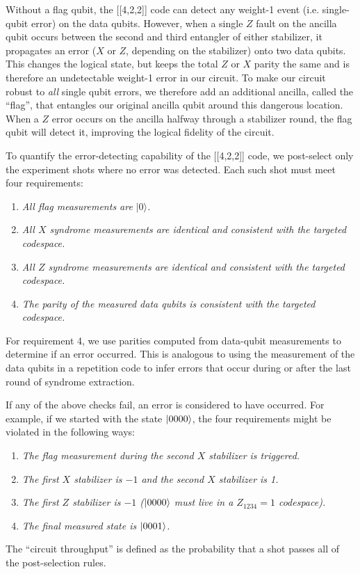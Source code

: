 \documentclass[aps,prl,twocolumn,superscriptaddress,nobibnotes,10pt,floatfix]{revtex4-2}
\begin{document}
Without a flag qubit, the {[}{[}4,2,2{]}{]} code can detect any weight-1 event (i.e. single-qubit error) on the data qubits.
However, when a single $Z$ fault on the ancilla qubit occurs between the second and third entangler of either stabilizer, it propagates an error ($X$ or $Z$, depending on the stabilizer) onto two data qubits.
This changes the logical state, but keeps the total $Z$ or $X$ parity the same and is therefore an undetectable weight-1 error in our circuit.
To make our circuit robust to \emph{all} single qubit errors, we therefore add an additional ancilla, called the ``flag'', that entangles our original ancilla qubit around this dangerous location.
When a $Z$ error occurs on the ancilla halfway through a stabilizer round, the flag qubit will detect it, improving the logical fidelity of the circuit.

To quantify the error-detecting capability of the {[}{[}4,2,2{]}{]} code, we post-select only the experiment shots where no error was detected.
Each such shot must meet four requirements:

\begin{enumerate}
	\def\labelenumi{\arabic{enumi}.}
	\item
	\emph{All flag measurements are} \(|0\rangle\)\emph{.}
	\item
	\emph{All $X$ syndrome measurements are identical and consistent with the targeted codespace.}
	\item
	\emph{All $Z$ syndrome measurements are identical and consistent with the targeted codespace.}
	\item
	\emph{The parity of the measured data qubits is consistent with the targeted codespace.}
\end{enumerate}

For requirement 4, we use parities computed from data-qubit measurements to determine if an error occurred.
This is analogous to using the measurement of the data qubits in a repetition code to infer errors that occur during or after the last round of syndrome extraction.

If any of the above checks fail, an error is considered to have occurred.
For example, if we started with the state $\ket{0000}$, the four requirements might be violated in the following ways:

\begin{enumerate}
	\def\labelenumi{\arabic{enumi}.}
	\item
	\emph{The flag measurement during the second $X$ stabilizer is triggered.}
	\item
	\emph{The first $X$ stabilizer is $-1$ and the second $X$ stabilizer is 1.}
	\item
	\emph{The first $Z$ stabilizer is $-1$  ($\ket{0000}$ must live in a $Z_{1234} = 1$ codespace).}
	\item
	\emph{The final measured state is $\ket{0001}$.}
\end{enumerate}
The ``circuit throughput'' is defined as the probability that a shot passes all of the post-selection rules.
\end{document}
